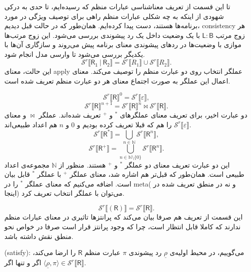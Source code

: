 \begin{defn}
تا این قسمت از تعریف معناشناسی عبارات منظم که رسیده‌ایم، تا حدی به درکی شهودی از اینکه به چه شکلی عبارات منظم راهی برای توصیف ویژگی‌ در مورد برنامه‌ها هستند، دست پیدا کرده‌ایم. همان‌طور که در حالت قبل دیدیم، \gls*{consistency} هر زوج مرتب
$\mathsf{L:B}$
با یک وضعیت داخل یک رد پیشوندی بررسی می‌‌شود. این زوج‌ مرتب‌ها موازی با وضعیت‌ها در ردهای پیشوندی معنای برنامه پیش می‌روند و سازگاری آن‌ها با یکدیگر بررسی می‌شود تا وارسی مدل انجام شود.
$$\mathcal{S}^r \llbracket\mathsf{R_1\:|\:R_2}\rrbracket= 
\mathcal{S}^r \llbracket R_1\rrbracket \cup
\mathcal{S}^r \llbracket R_2\rrbracket.$$
این حالت، معنای \gls*{apply} عملگر انتخاب روی دو عبارت منظم را توصیف می‌کند. معنای اعمال این عملگر به صورت اجتماع معنای هر دو عبارت منظم تعریف شده است.

$$\mathcal{S}^r \llbracket\mathsf{R}\rrbracket^0 = \mathcal{S}^r\llbracket\varepsilon\rrbracket,$$
$$\mathcal{S}^r \llbracket\mathsf{R}\rrbracket^{n+1} = \mathcal{S}^r \llbracket\mathsf{R}\rrbracket^{n} \Join
\mathcal{S}^r \llbracket\mathsf{R}\rrbracket.$$
دو عبارت اخیر، برای تعریف معنای عملگرهای $^*$ و $^+$ تعریف شده‌اند. عملگر $\Join$ و معنای 
$\mathcal{S}^r\llbracket\varepsilon\rrbracket$
را هم که قبلا تعریف کرده بودیم و $0$ و $n$ هم اعداد طبیعی‌اند.
$$\mathcal{S}^r\llbracket\mathsf{R^*}\rrbracket =  \bigcup_{n \in \mathbb{N}}
\mathcal{S}^r \llbracket\mathsf{R}^n\rrbracket,$$
$$\mathcal{S}^r\llbracket\mathsf{R^+}\rrbracket =  \bigcup_{n \in \mathbb{N}\setminus\{0\}}
\mathcal{S}^r \llbracket\mathsf{R}^n\rrbracket.$$
این دو عبارت تعریف معنای دو عملگر $^*$ و $^+$ هستند. منظور از $\mathbb{N}$ مجموعه‌ی اعداد طبیعی است. همان‌طور که قبل‌تر هم اشاره شد، معنای عملگر $^+$ با عملگر $^*$ قابل بیان است. اضافه می‌کنیم که معنای عملگر $^*$ را در \gls*{meta}( و نه در منطق تعریف شده در اینجا) می‌توان با عملگر انتخاب تعریف کرد.

$$\mathcal{S}^r \llbracket(\mathsf{R})\rrbracket=\mathcal{S}^r \llbracket\mathsf{R}\rrbracket.$$
این قسمت از تعریف هم صرفا بیان می‌کند که پرانتزها تاثیری در معنای عبارات منظم ندارند که کاملا قابل انتظار است، چرا که وجود پرانتز قرار است صرفا در خواص نحو منطق نقش داشته باشد.

\end{defn}

\begin{defn}
	(\gls*{satisfy}): می‌گوییم، در محیط اولیه‌ی $\underline{\rho}$ رد پیشوندی $\pi$ عبارت منظم $\mathsf{R}$ را ارضا می‌کند، اگر و تنها اگر 
	$\langle \underline{\rho},\pi \rangle \in \mathcal{S}^r \llbracket \mathsf{R} \rrbracket$. 
\end{defn}

